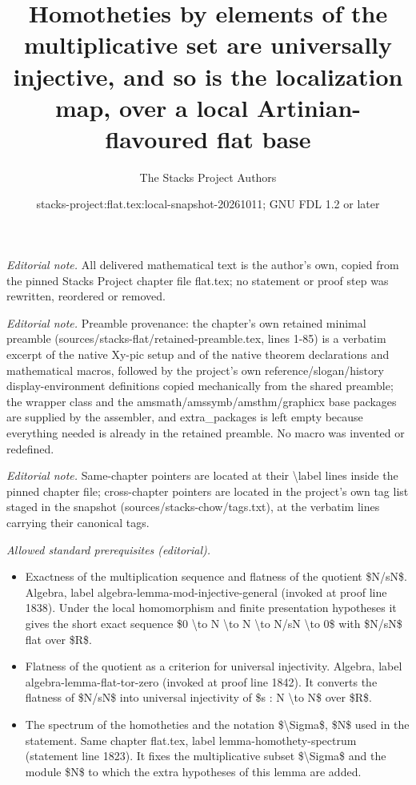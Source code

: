 \documentclass[10pt,a4paper]{amsart}
\title{Homotheties by elements of the multiplicative set are universally injective, and so is the localization map, over a local Artinian-flavoured flat base}
\author{The Stacks Project Authors}
\date{stacks-project:flat.tex:local-snapshot-20261011; GNU FDL 1.2 or later}
\theoremstyle{plain}
\theoremstyle{definition}
\theoremstyle{remark}
\numberwithin{equation}{subsection}
\begin{document}
\maketitle
\noindent\textit{Editorial note.} All delivered mathematical text is the author's own, copied from the pinned Stacks Project chapter file flat.tex; no statement or proof step was rewritten, reordered or removed.\par\medskip
\noindent\textit{Editorial note.} Preamble provenance: the chapter's own retained minimal preamble (sources/stacks-flat/retained-preamble.tex, lines 1-85) is a verbatim excerpt of the native Xy-pic setup and of the native theorem declarations and mathematical macros, followed by the project's own reference/slogan/history display-environment definitions copied mechanically from the shared preamble; the wrapper class and the amsmath/amssymb/amsthm/graphicx base packages are supplied by the assembler, and extra\_packages is left empty because everything needed is already in the retained preamble. No macro was invented or redefined.\par\medskip
\noindent\textit{Editorial note.} Same-chapter pointers are located at their \textbackslash{}label lines inside the pinned chapter file; cross-chapter pointers are located in the project's own tag list staged in the snapshot (sources/stacks-chow/tags.txt), at the verbatim lines carrying their canonical tags.\par\medskip
\noindent\textit{Allowed standard prerequisites (editorial).}\begin{itemize}
\item Exactness of the multiplication sequence and flatness of the quotient \$N/sN\$. Algebra, label algebra-lemma-mod-injective-general (invoked at proof line 1838). Under the local homomorphism and finite presentation hypotheses it gives the short exact sequence \$0 \textbackslash{}to N \textbackslash{}to N \textbackslash{}to N/sN \textbackslash{}to 0\$ with \$N/sN\$ flat over \$R\$.
\item Flatness of the quotient as a criterion for universal injectivity. Algebra, label algebra-lemma-flat-tor-zero (invoked at proof line 1842). It converts the flatness of \$N/sN\$ into universal injectivity of \$s : N \textbackslash{}to N\$ over \$R\$.
\item The spectrum of the homotheties and the notation \$\textbackslash{}Sigma\$, \$N\$ used in the statement. Same chapter flat.tex, label lemma-homothety-spectrum (statement line 1823). It fixes the multiplicative subset \$\textbackslash{}Sigma\$ and the module \$N\$ to which the extra hypotheses of this lemma are added.
\end{itemize}\medskip
\end{document}
